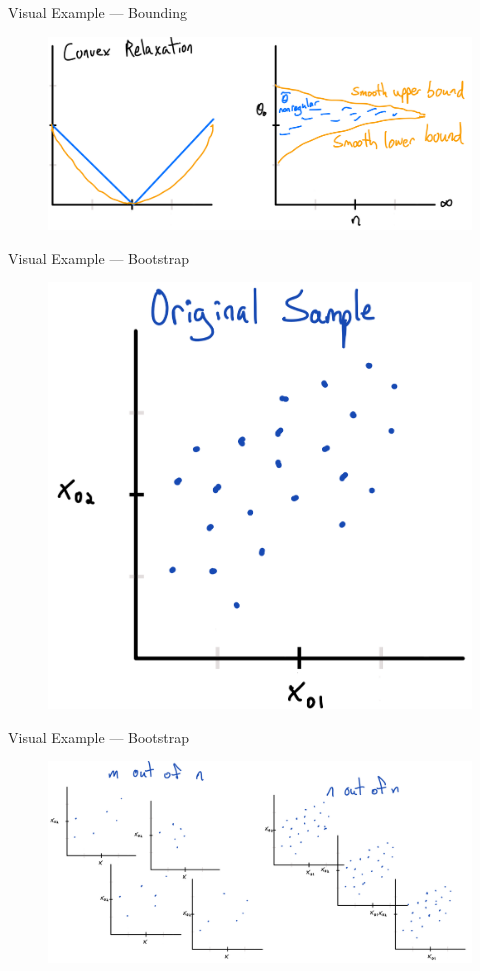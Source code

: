 \documentclass[aspectratio=169, professionalfonts]{beamer}
\begin{document}
\begin{frame}{Visual Example --- Bounding}
	\begin{figure}
		\includegraphics[width=\textwidth]{figures/sketch-bounding}
	\end{figure}

\end{frame}
\begin{frame}{Visual Example --- \mon Bootstrap}
	\begin{figure}
		\includegraphics[width=.55\textwidth]{figures/sketch-bootstrap1}
	\end{figure}

\end{frame}
\begin{frame}{Visual Example --- \mon Bootstrap}
	\begin{figure}
		\includegraphics[width=\textwidth]{figures/sketch-bootstrap2}
	\end{figure}

\end{frame}
\end{document}
